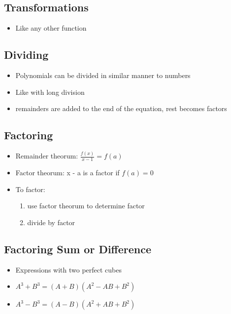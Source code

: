 \documentclass{article}
\begin{document}
    \subsection{Transformations}
    \begin{itemize}
        \item Like any other function
    \end{itemize}

    \subsection{Dividing}
    \begin{itemize}
        \item Polynomials can be divided in similar manner to numbers
        \item Like with long division
        \item remainders are added to the end of the equation, rest becomes factors
    \end{itemize}

    \subsection{Factoring}
    \begin{itemize}
        \item Remainder theorum: $\frac{f(x)}{x-1} = f(a)$
        \item Factor theorum: x - a is a factor if $f(a) = 0$
        \item To factor:
        \begin{enumerate}
            \item use factor theorum to determine factor
            \item divide by factor
        \end{enumerate}
    \end{itemize}

    \subsection{Factoring Sum or Difference}
    \begin{itemize}
        \item Expressions with two perfect cubes
        \item $A^3 + B^3 = (A+B)(A^2-AB+B^2)$
        \item $A^3 - B^3 = (A-B)(A^2+AB+B^2)$
    \end{itemize}
\end{document}
